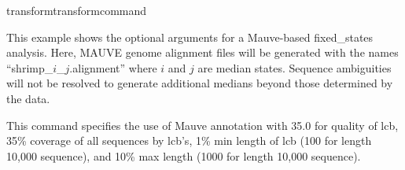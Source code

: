 \begin{command}{transform}{transformcommand}
\begin{poyexamples}

		{This example shows the optional arguments for a Mauve-based fixed\_states analysis.
		Here, MAUVE genome alignment files will be generated with the names ``shrimp\_$i$\_$j$.alignment'' where $i$ and $j$ 
		are median states.  Sequence ambiguities will not be resolved to generate additional medians beyond those determined 
		by the data.}
		
		{This command specifies the use of Mauve annotation with 35.0 for quality of lcb,
		35\% coverage of all sequences by lcb's, 1\% min length of lcb (100 for length 10,000 
		sequence), and 10\% max length (1000 for length 10,000 sequence).}
            
	\end{poyexamples}	    

\end{command}


